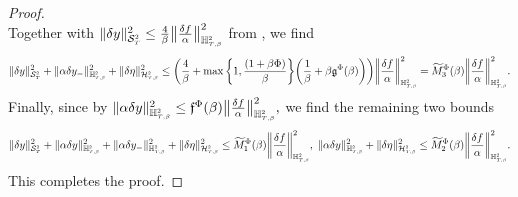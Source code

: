 \documentclass[10pt]{article} %
\newcommand\cH{\mathcal H}
\newcommand\cS{\mathcal S}
\newcommand{\smalltext}[1]{\text{\fontsize{4}{4}\selectfont$#1$}}
\newcommand\ff{\mathfrak f}
\newcommand\fg{\mathfrak g}
\def \H{\mathbb{H}}
\newcommand{\1}{\mathbf{1}}
\begin{document}
\begin{proof}
\begin{equation*}
	\end{equation*}
	Together with $\|\delta y\|^2_{\cS^\smalltext{2}_\smalltext{T}} \leq \frac{4}{\beta} \big\|\frac{\delta f}{\alpha}\big\|^2_{\H^\smalltext{2}_{\smalltext{T}\smalltext{,}\smalltext{\beta}}}$ from , 
	we find
	\begin{equation*}
		\|\delta y\|^2_{\cS^\smalltext{2}_\smalltext{T}} + \|\alpha\delta y_{-}\|^2_{\H^\smalltext{2}_{\smalltext{T}\smalltext{,}\smalltext{\beta}}} + \|\delta\eta\|^2_{\cH^\smalltext{2}_{\smalltext{T}\smalltext{,}\smalltext{\beta}}} \leq \bigg(\frac{4}{\beta} + \max\bigg\{1,\frac{(1+\beta\Phi)}{\beta}\bigg\}\bigg(\frac{1}{\beta} + \beta \fg^\Phi(\beta)\bigg)\bigg) \bigg\|\frac{\delta f}{\alpha}\bigg\|^2_{\H^\smalltext{2}_{\smalltext{T}\smalltext{,}\smalltext{\beta}}} = \widetilde M^\Phi_3(\beta)\bigg\|\frac{\delta f}{\alpha}\bigg\|^2_{\H^\smalltext{2}_{\smalltext{T}\smalltext{,}\smalltext{\beta}}}.
	\end{equation*}
	Finally, since by  $
		\|\alpha \delta y\|^2_{\H^{\smalltext{2}}_{\smalltext{T}\smalltext{,}\smalltext{\beta}}} 
		\leq \ff^\Phi(\beta) \big\| \frac{\delta f}{\alpha} \big\|^2_{\H^{\smalltext{2}}_{\smalltext{T}\smalltext{,}\smalltext{\beta}}},
$
	we find the remaining two bounds
	\begin{equation*}
		\|\delta y\|^2_{\cS^\smalltext{2}_\smalltext{T}} + \|\alpha \delta y\|^2_{\H^{\smalltext{2}}_{\smalltext{T}\smalltext{,}\smalltext{\beta}}} + \|\alpha\delta y_{-}\|^2_{\H^\smalltext{2}_{\smalltext{T}\smalltext{,}\smalltext{\beta}}} + \|\delta\eta\|^2_{\cH^\smalltext{2}_{\smalltext{T}\smalltext{,}\smalltext{\beta}}} 
		\leq \widetilde M^\Phi_1(\beta) \bigg\| \frac{\delta f}{\alpha} \bigg\|^2_{\H^{\smalltext{2}}_{\smalltext{T}\smalltext{,}\smalltext{\beta}}},\;
		\|\alpha \delta y\|^2_{\H^{\smalltext{2}}_{\smalltext{T}\smalltext{,}\smalltext{\beta}}} + \|\delta\eta\|^2_{\cH^\smalltext{2}_{\smalltext{T}\smalltext{,}\smalltext{\beta}}} 
		\leq \widetilde M^\Phi_2(\beta) \bigg\| \frac{\delta f}{\alpha} \bigg\|^2_{\H^{\smalltext{2}}_{\smalltext{T}\smalltext{,}\smalltext{\beta}}}.
	\end{equation*}
	This completes the proof.
\end{proof}
\end{document}
